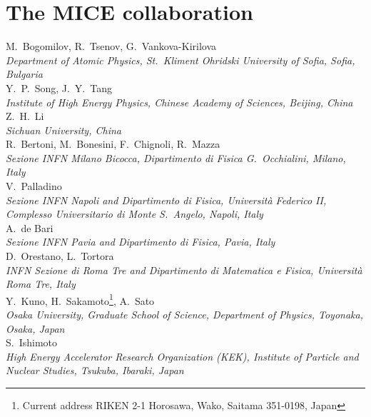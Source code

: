 %

\thispagestyle{plain}
\setlength\parindent{0em}%

\section*{The MICE collaboration}

M.~Bogomilov,  R.~Tsenov, G.~Vankova-Kirilova
\\{\it
   Department of Atomic Physics, St.~Kliment Ohridski University of Sofia, Sofia, Bulgaria
}\\

Y.~P.~Song, J.~Y.~Tang
\\{\it
Institute of High Energy Physics, Chinese Academy of Sciences, Beijing, China
}\\

Z.~H.~Li
\\{\it
Sichuan University, China
}\\

R.~Bertoni, M.~Bonesini, F.~Chignoli, R.~Mazza
\\{\it
Sezione INFN Milano Bicocca, Dipartimento di Fisica G.~Occhialini, Milano, Italy
}\\


V.~Palladino
\\{\it
Sezione INFN Napoli and Dipartimento di Fisica, Universit\`{a} Federico II, Complesso Universitario di Monte S.~Angelo, Napoli, Italy
}\\

A.~de Bari
\\{\it 
Sezione INFN Pavia and Dipartimento di Fisica, Pavia, Italy
}\\

D.~Orestano, L.~Tortora
\\{\it
INFN Sezione di Roma Tre and Dipartimento di Matematica e Fisica, Universit\`{a} Roma Tre, Italy
}\\

Y.~Kuno, H.~Sakamoto\footnote{Current address RIKEN 2-1 Horosawa, Wako, Saitama 351-0198, Japan}, A.~Sato
\\{\it
Osaka University, Graduate School of Science, Department of Physics, Toyonaka, Osaka, Japan
}\\

S.~Ishimoto
\\{\it
High Energy Accelerator Research Organization (KEK), Institute of Particle and Nuclear Studies, Tsukuba, Ibaraki, Japan
}\\



